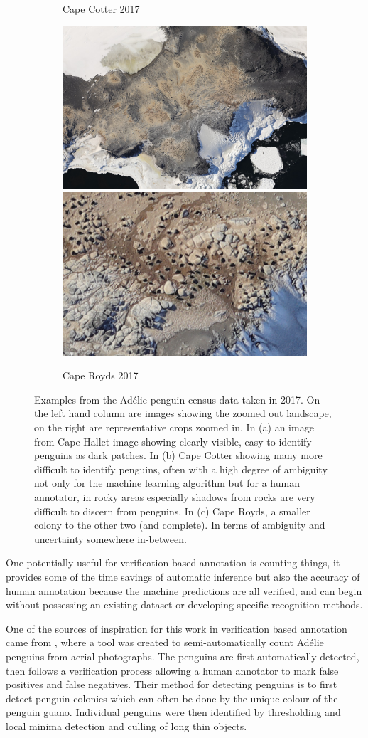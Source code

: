 \begin{figure}[H]
\begin{subfigure}[t]{1.0\linewidth}
  \caption{Cape Cotter 2017}
\end{subfigure}
\begin{subfigure}[t]{1.0\linewidth}
  \includegraphics[width=0.475\linewidth]{figures/annotation/penguin/royds_large.jpg}
  \hfill
  \includegraphics[width=0.475\linewidth]{figures/annotation/penguin/royds.jpg}
  \caption{Cape Royds 2017}
\end{subfigure}

\caption{Examples from the Ad\'elie penguin census data taken in 2017. On the left hand column are images showing the zoomed out landscape, on the right are representative crops zoomed in.  In (a) an image from Cape Hallet image showing clearly visible, easy to identify penguins as dark patches. In (b) Cape Cotter showing many more difficult to identify penguins, often with a high degree of ambiguity not only for the machine learning algorithm but for a human annotator, in rocky areas especially shadows from rocks are very difficult to discern from penguins. In (c) Cape Royds, a smaller colony to the other two (and complete). In terms of ambiguity and uncertainty somewhere in-between. }
\label {fig:penguin_examples}
\end{figure}


One potentially useful for verification based annotation is counting things, it provides some of the time savings of automatic inference but also the accuracy of human annotation because the machine predictions are all verified, and can begin without possessing an existing dataset or developing specific recognition methods. 

One of the sources of inspiration for this work in verification based annotation came from \cite{McNeill2011}, where a tool was created to semi-automatically count Ad\'elie penguins from aerial photographs. The penguins are first automatically detected, then follows a verification process allowing a human annotator to mark false positives and false negatives. Their method for detecting penguins is to first detect penguin colonies which can often be done by the unique colour of the penguin guano. Individual penguins were then identified by thresholding and local minima detection and culling of long thin objects. 


